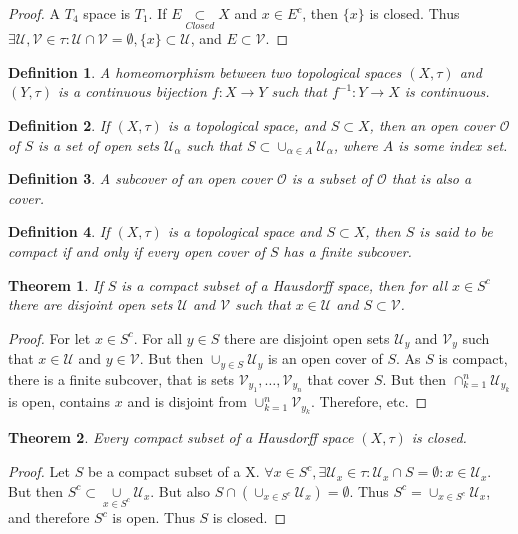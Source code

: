 \documentclass[crop=false,class=book]{standalone}
\theoremstyle{mystyle}
\newtheorem{theorem}{Theorem}[section]
\newtheorem{definition}{Definition}[section]
\begin{document}
\begin{proof}
A $T_4$ space is $T_1$. If $E\underset{Closed}\subset X$ and $x\in E^c$, then $\{x\}$ is closed. Thus $\exists \mathcal{U},\mathcal{V}\in\tau: \mathcal{U}\cap\mathcal{V}=\emptyset, \{x\}\subset \mathcal{U}$, and $E\subset \mathcal{V}$.
\end{proof}
\begin{definition}
A homeomorphism between two topological spaces $(X,\tau)$ and $(Y,\tau)$ is a continuous bijection $f:X\rightarrow Y$ such that $f^{-1}:Y\rightarrow X$ is continuous.
\end{definition}
\begin{definition}
If $(X,\tau)$ is a topological space, and $S\subset X$, then an open cover $\mathcal{O}$ of $S$ is a set of open sets $\mathcal{U}_{\alpha}$ such that $S\subset \cup_{\alpha\in A} \mathcal{U}_{\alpha}$, where $A$ is some index set.
\end{definition}
\begin{definition}
A subcover of an open cover $\mathcal{O}$ is a subset of $\mathcal{O}$ that is also a cover.
\end{definition}
\begin{definition}
If $(X,\tau)$ is a topological space and $S\subset X$, then $S$ is said to be compact if and only if every open cover of $S$ has a finite subcover.
\end{definition}
\begin{theorem}
If $S$ is a compact subset of a Hausdorff space, then for all $x\in S^c$ there are disjoint open sets $\mathcal{U}$ and $\mathcal{V}$ such that $x\in \mathcal{U}$ and $S\subset \mathcal{V}$.
\end{theorem}
\begin{proof}
For let $x\in S^c$. For all $y\in S$ there are disjoint open sets $\mathcal{U}_y$ and $\mathcal{V}_y$ such that $x\in \mathcal{U}$ and $y\in \mathcal{V}$. But then $\cup_{y\in S} \mathcal{U}_y$ is an open cover of $S$. As $S$ is compact, there is a finite subcover, that is sets $\mathcal{V}_{y_1},\hdots, \mathcal{V}_{y_n}$ that cover $S$. But then $\cap_{k=1}^{n} \mathcal{U}_{y_k}$ is open, contains $x$ and is disjoint from $\cup_{k=1}^{n} \mathcal{V}_{y_k}$. Therefore, etc.
\end{proof}
\begin{theorem}
Every compact subset of a Hausdorff space $(X,\tau)$ is closed.
\end{theorem}
\begin{proof}
Let $S$ be a compact subset of a X. $\forall x\in S^c, \exists \mathcal{U}_x\in \tau:\mathcal{U}_x\cap S = \emptyset:x\in \mathcal{U}_x$. But then $S^c \subset \underset{x\in S^c}\cup\mathcal{U}_x$. But also $S\cap (\cup_{x\in S^c}\mathcal{U}_x) = \emptyset$. Thus $S^c = \cup_{x\in S^c}\mathcal{U}_x$, and therefore $S^c$ is open. Thus $S$ is closed.
\end{proof}
\end{document}
